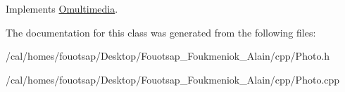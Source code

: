 Implements \hyperlink{class_omultimedia_ab3836cd1744e98bdc6752ebd0283911e}{Omultimedia}.



The documentation for this class was generated from the following files\+:\begin{DoxyCompactItemize}
\item 
/cal/homes/fouotsap/\+Desktop/\+Fouotsap\+\_\+\+Foukmeniok\+\_\+\+Alain/cpp/Photo.\+h\item 
/cal/homes/fouotsap/\+Desktop/\+Fouotsap\+\_\+\+Foukmeniok\+\_\+\+Alain/cpp/Photo.\+cpp\end{DoxyCompactItemize}
